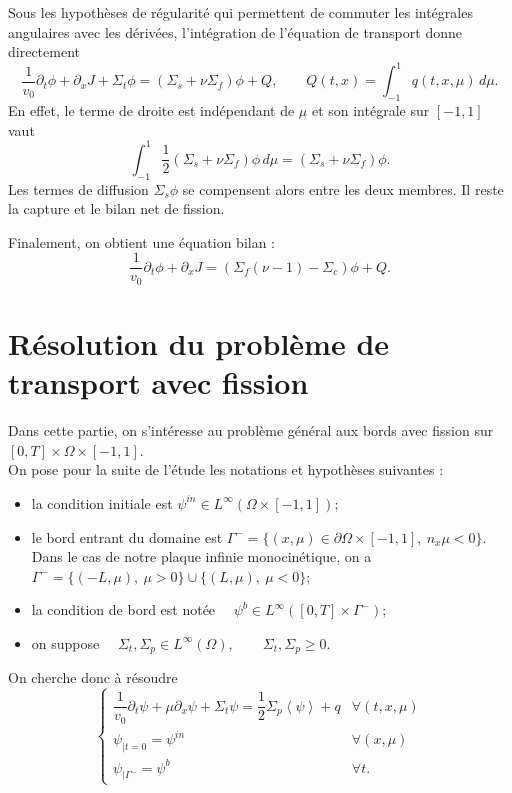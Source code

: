 \documentclass{article}
\begin{document}
Sous les hypothèses de régularité qui permettent de commuter les intégrales angulaires avec les dérivées, l'intégration de l'équation de transport donne directement
\[
\frac1{v_0}\partial_t\phi+\partial_xJ+\Sigma_t\phi
=(\Sigma_s+\nu\Sigma_f)\phi+Q,
\qquad
Q(t,x)=\int_{-1}^1q(t,x,\mu)\,d\mu.
\]
En effet, le terme de droite est indépendant de $\mu$ et son intégrale sur $[-1,1]$ vaut
\[
\int_{-1}^1\frac12(\Sigma_s+\nu\Sigma_f)\phi\,d\mu
=(\Sigma_s+\nu\Sigma_f)\phi.
\]
Les termes de diffusion $\Sigma_s\phi$ se compensent alors entre les deux membres. Il reste la capture et le bilan net de fission.

Finalement, on obtient une équation bilan :
\begin{equation}
    \boxed{\frac1{v_0}\partial_t\phi+\partial_xJ
    =\left(\Sigma_f(\nu-1)-\Sigma_c\right)\phi + Q.}
    \label{Equation bilan de transport générale}
\end{equation}


\section{Résolution du problème de transport avec fission}

Dans cette partie, on s’intéresse au problème général aux bords avec fission sur\([0,T]\times\Omega\times[-1,1].\)\\
On pose pour la suite de l’étude les notations et hypothèses suivantes :
\begin{itemize}
    \item la condition initiale est \(\psi^{in}\in L^\infty(\Omega\times[-1,1]);\)

    \item le bord entrant du domaine est \(\Gamma^- = \{(x,\mu)\in\partial\Omega\times[-1,1],\ n_x\mu<0\}.\)\\
    Dans le cas de notre plaque infinie monocinétique, on a \(\Gamma^- =\{(-L,\mu),\ \mu>0\}\cup\{(L,\mu),\ \mu<0\};\)

    \item la condition de bord est notée \(\quad \psi^b\in L^\infty([0,T]\times\Gamma^-);\)

    \item on suppose \(\quad\Sigma_t,\Sigma_p\in L^\infty(\Omega), \qquad\Sigma_t,\Sigma_p\geq0.\)
\end{itemize}

On cherche donc à résoudre
\[
\begin{cases}
    \dfrac1{v_0}\partial_t\psi + \mu\partial_x\psi + \Sigma_t\psi = \dfrac12\Sigma_p\left\langle\psi\right\rangle+q  &\forall(t,x,\mu)\\
    \psi_{|t=0} =\psi^{in} &\forall(x,\mu) \\
    \psi_{|\Gamma^-} =\psi^b & \forall t.
\end{cases}
\]
\end{document}
